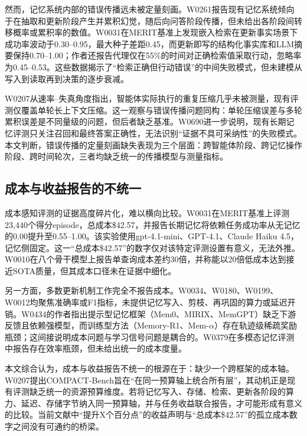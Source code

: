 然而，记忆系统内部的错误传播远未被定量刻画。W0261报告现有记忆系统倾向于在抽取和更新阶段产生并累积幻觉，随后向问答阶段传播，但未给出各阶段间转移概率或累积率的数值\cite{W0261}。W0031在MERIT基准上发现嵌入检索在更新事实场景下成功率波动于0.30–0.95，最大种子差距0.45，而更新即写的结构化事实库和LLM摘要保持0.70–1.00；作者还报告代理仅在55\%的时间对正确检索值采取行动，忽略率为0.45–0.53\cite{W0031}。这些数据揭示了“检索正确但行动错误”的中间失败模式，但未建模从写入到读取再到决策的逐步衰减。

W0207从速率–失真角度指出，智能体实际执行的重复压缩几乎未被测量，现有评测仅覆盖单轮长上下文压缩\cite{W0207}。这一观察与错误传播问题同构：单轮压缩误差与多轮累积误差是不同量级的问题，但后者缺乏基准。W0690进一步说明，现有长期记忆评测只关注召回和最终答案正确性，无法识别“证据不具可采纳性”的失败模式\cite{W0690}。本文判断，错误传播的定量刻画缺失表现为三个层面：跨智能体阶段、跨记忆操作阶段、跨时间轮次，三者均缺乏统一的传播模型与测量指标。

\subsection{成本与收益报告的不统一}

成本感知评测的证据高度碎片化，难以横向比较。W0031在MERIT基准上评测23,440个得分episode，总成本\$42.57，并报告长期记忆将依赖任务成功率从无记忆的0.00提升至0.55–1.00\cite{W0031}。该实验使用gpt-4.1-mini、GPT-4.1、Claude Haiku 4.5，记忆侧固定。这一“总成本\$42.57”的数字仅对该特定评测设置有意义，无法外推。W0010在八个骨干模型上报告单查询成本差约30倍，并称能以20倍低成本达到接近SOTA质量，但其成本口径未在证据中细化\cite{W0010}。

另一方面，多数更新机制工作完全不报告成本。W0034、W0180、W0199、W0012均聚焦准确率或F1指标，未提供记忆写入、剪枝、再巩固的算力或延迟开销\cite{W0034,W0180,W0199,W0012}。W0434的作者指出提示型记忆框架（Mem0、MIRIX、MemGPT）缺乏下游反馈且依赖强模型，而训练型方法（Memory-R1、Mem-$\alpha$）存在轨迹级稀疏奖励瓶颈\cite{W0434}；这间接说明成本问题与学习信号问题是耦合的。W0379在多模态记忆评测中报告存在效率瓶颈，但未给出统一的成本度量\cite{W0379}。

本文综合认为，成本与收益报告不统一的根源在于：缺少一个跨框架的成本轴。W0207提出COMPACT-Bench旨在“在同一预算轴上统合所有层”，其动机正是现有评测缺乏统一的资源预算维度\cite{W0207}。若将记忆写入、存储、检索、更新各阶段的算力、延迟、存储字节纳入同一预算轴，并与任务收益联合报告，才可能形成有意义的比较。当前文献中“提升X个百分点”的收益声明与“总成本\$42.57”的孤立成本数字之间没有可通约的桥梁。

